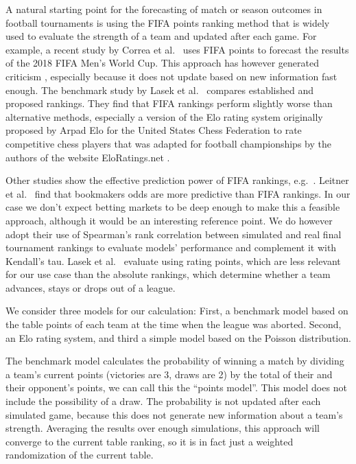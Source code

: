 \documentclass[12pt,a4paper]{article}
\begin{document}
A natural starting point for the forecasting of match or season outcomes
in football tournaments is using the FIFA points ranking method that is
widely used to evaluate the strength of a team and updated after each
game. For example, a recent study by Correa et al.~\autocite*{correa}
uses FIFA points to forecast the results of the 2018 FIFA Men's World
Cup. This approach has however generated criticism
\textcite{mchale2007}, especially because it does not update based on
new information fast enough. The benchmark study by Lasek et
al.~\autocite*{lasek2013} compares established and proposed rankings.
They find that FIFA rankings perform slightly worse than alternative
methods, especially a version of the Elo rating system originally
proposed by Arpad Elo for the United States Chess Federation to rate
competitive chess players that was adapted for football championships by
the authors of the website EloRatings.net \autocite*{eloratings}.

Other studies show the effective prediction power of FIFA rankings,
e.g.~\textcite{suzuki2008}. Leitner et al.~\autocite*{leitner2010} find
that bookmakers odds are more predictive than FIFA rankings. In our case
we don't expect betting markets to be deep enough to make this a
feasible approach, although it would be an interesting reference point.
We do however adopt their use of Spearman's rank correlation between
simulated and real final tournament rankings to evaluate models'
performance and complement it with Kendall's tau. Lasek et
al.~\autocite*{lasek2013} evaluate using rating points, which are less
relevant for our use case than the absolute rankings, which determine
whether a team advances, stays or drops out of a league.

We consider three models for our calculation: First, a benchmark model
based on the table points of each team at the time when the league was
aborted. Second, an Elo rating system, and third a simple model based on
the Poisson distribution.

The benchmark model calculates the probability of winning a match by
dividing a team's current points (victories are 3, draws are 2) by the
total of their and their opponent's points, we can call this the
\enquote{points model}. This model does not include the possibility of a
draw. The probability is not updated after each simulated game, because
this does not generate new information about a team's strength.
Averaging the results over enough simulations, this approach will
converge to the current table ranking, so it is in fact just a weighted
randomization of the current table.
\end{document}
